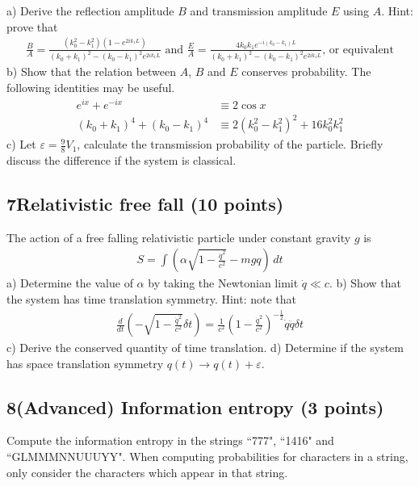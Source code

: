 \documentclass[12pt]{book} %
\numberwithin{equation}{chapter}
\def\a{\alpha}
\def\d{\delta}
\def\e{\varepsilon}
\def\lq{\hspace{2.5ex}}
\begin{document}
\noindent a) Derive the reflection amplitude $B$ and transmission amplitude $E$ using $A$.\bigskip\newline
Hint: prove that
\begin{align*}
\frac{B}{A}=\frac{\left(k_{0}^{2}-k_{1}^{2}\right)\left(1-e^{2ik_{1}L}\right)}{\left(k_{0}+k_{1}\right)^{2}-\left(k_{0}-k_{1}\right)^{2}e^{2ik_{1}L}}\text{ and }\frac{E}{A}=\frac{4k_{0}k_{1}e^{-i\left(k_{0}-k_{1}\right)L}}{\left(k_{0}+k_{1}\right)^{2}-\left(k_{0}-k_{1}\right)^{2}e^{2ik_{1}L}}\text{, or equivalent}
\end{align*}
b) Show that the relation between $A$, $B$ and $E$ conserves probability. The following identities may be useful.
\begin{align*}
e^{ix}+e^{-ix}&\equiv2\cos x\\
\left(k_{0}+k_{1}\right)^{4}+\left(k_{0}-k_{1}\right)^{4}&\equiv2\left(k_{0}^{2}-k_{1}^{2}\right)^{2}+16k_{0}^{2}k_{1}^{2}
\end{align*}
c) Let $\e=\frac{9}{8}V_{1}$, calculate the transmission probability of the particle. Briefly discuss the difference if the system is classical.

\subsection*{7\lq Relativistic free fall (10 points)}
The action of a free falling relativistic particle under constant gravity $g$ is
\begin{align*}
S=\int \left(\a\sqrt{1-\frac{\dot{q}^{2}}{c^{2}}}-mgq\right)\,dt
\end{align*}
a) Determine the value of $\a$ by taking the Newtonian limit $\dot{q}\ll c$.\bigskip\newline
b) Show that the system has time translation symmetry.\bigskip\newline
Hint: note that
\begin{align*}
\frac{d}{dt}\left(-\sqrt{1-\frac{\dot{q}^{2}}{c^{2}}}\d t\right)=\frac{1}{c^{2}}\left(1-\frac{\dot{q}^{2}}{c^{2}}\right)^{-\frac{1}{2}}\dot{q}\ddot{q}\d t
\end{align*}
c) Derive the conserved quantity of time translation.\bigskip\newline
d) Determine if the system has space translation symmetry $q(t)\to q(t)+\e$.

\subsection*{8\lq (Advanced) Information entropy (3 points)}
Compute the information entropy in the strings ``777", ``1416" and ``\textcolor{Lung Mun}{GLMMMNNUUUYY}". When computing probabilities for characters in a string, only consider the characters which appear in that string.
\end{document}
